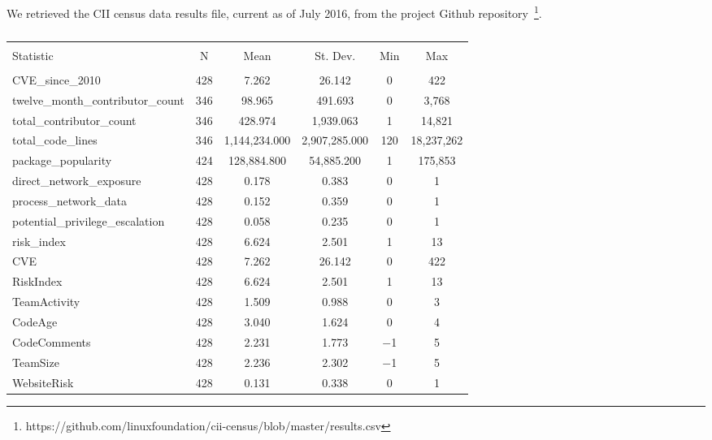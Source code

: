 We retrieved the CII census data results file, current as of July 2016, from the project Github repository~\footnote{https://github.com/linuxfoundation/cii-census/blob/master/results.csv}. 


\begin{table*}[!htbp] \centering 
	\caption{} 
	\label{} 
	\begin{small}
	\begin{tabular}{@{\extracolsep{5pt}}lccccc} 
		\\[-1.8ex]\hline 
		\hline \\[-1.8ex] 
		Statistic & \multicolumn{1}{c}{N} & \multicolumn{1}{c}{Mean} & \multicolumn{1}{c}{St. Dev.} & \multicolumn{1}{c}{Min} & \multicolumn{1}{c}{Max} \\ 
		\hline \\[-1.8ex] 
		CVE\_since\_2010 & 428 & 7.262 & 26.142 & 0 & 422 \\ 
		twelve\_month\_contributor\_count & 346 & 98.965 & 491.693 & 0 & 3,768 \\ 
		total\_contributor\_count & 346 & 428.974 & 1,939.063 & 1 & 14,821 \\ 
		total\_code\_lines & 346 & 1,144,234.000 & 2,907,285.000 & 120 & 18,237,262 \\ 
		package\_popularity & 424 & 128,884.800 & 54,885.200 & 1 & 175,853 \\ 
		direct\_network\_exposure & 428 & 0.178 & 0.383 & 0 & 1 \\ 
		process\_network\_data & 428 & 0.152 & 0.359 & 0 & 1 \\ 
		potential\_privilege\_escalation & 428 & 0.058 & 0.235 & 0 & 1 \\ 
		risk\_index & 428 & 6.624 & 2.501 & 1 & 13 \\ 
		CVE & 428 & 7.262 & 26.142 & 0 & 422 \\ 
		RiskIndex & 428 & 6.624 & 2.501 & 1 & 13 \\ 
		TeamActivity & 428 & 1.509 & 0.988 & 0 & 3 \\ 
		CodeAge & 428 & 3.040 & 1.624 & 0 & 4 \\ 
		CodeComments & 428 & 2.231 & 1.773 & $-$1 & 5 \\ 
		TeamSize & 428 & 2.236 & 2.302 & $-$1 & 5 \\ 
		WebsiteRisk & 428 & 0.131 & 0.338 & 0 & 1 \\ 

\end{tabular}
\end{small}
\end{table*}
